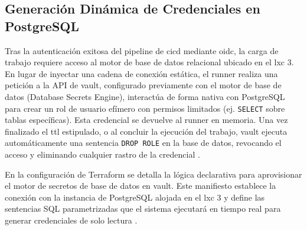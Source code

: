 \documentclass[runningheads]{llncs}
\begin{document}














\subsection*{Generación Dinámica de Credenciales en PostgreSQL}
Tras la autenticación exitosa del pipeline de \gls{cicd} mediante \gls{oidc}, la carga de trabajo requiere acceso al motor de base de datos relacional ubicado en el \gls{lxc} 3. En lugar de inyectar una cadena de conexión estática, el runner realiza una petición a la API de \gls{vault}, configurado previamente con el motor de base de datos (Database Secrets Engine), interactúa de forma nativa con PostgreSQL para crear un rol de usuario efímero con permisos limitados (ej. \texttt{SELECT} sobre tablas específicas). Esta credencial se devuelve al runner en memoria. Una vez finalizado el \gls{ttl} estipulado, o al concluir la ejecución del trabajo, \gls{vault} ejecuta automáticamente una sentencia \texttt{DROP ROLE} en la base de datos, revocando el acceso y eliminando cualquier rastro de la credencial \parencite{vault_database_secrets_engine}.

En la configuración de Terraform se detalla la lógica declarativa para aprovisionar el motor de secretos de base de datos en \gls{vault}. Este manifiesto establece la conexión con la instancia de PostgreSQL alojada en el \gls{lxc} 3 y define las sentencias SQL parametrizadas que el sistema ejecutará en tiempo real para generar credenciales de solo lectura \parencite{terraform_documentation,vault_database_secrets_engine}.
\end{document}
